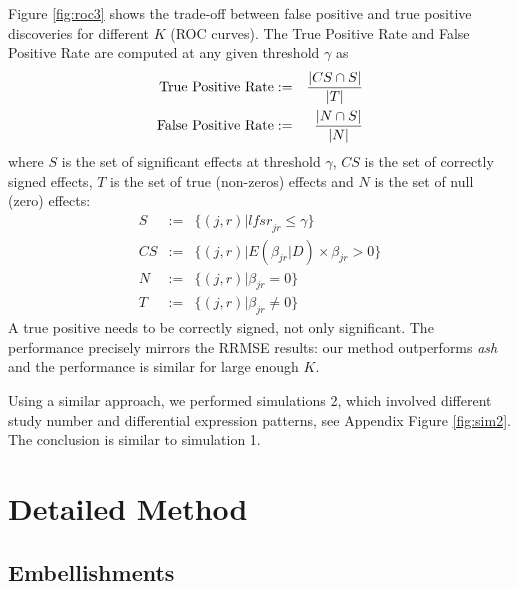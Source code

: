 \documentclass[12pt]{article}
\def\lfsr{\textit{lfsr}}
\begin{document}
\vspace{4mm}\noindent Figure \ref{fig:roc3} shows the trade-off between false positive and true positive discoveries for different $K$ (ROC curves). The True Positive Rate and False Positive Rate are computed at any given threshold $\gamma$ as
\begin{eqnarray}
\textmd{True Positive Rate} &:=& \frac{|CS\cap S|}{|T|}\\
\textmd{False Positive Rate} &:=& \frac{|N\cap S|}{|N|}
\end{eqnarray}
where $S$ is the set of significant effects at threshold $\gamma$, $CS$ is the set of correctly signed effects, $T$ is the set of true (non-zeros) effects and $N$ is the set of null (zero) effects:
\begin{eqnarray}
S &:=& \{(j,r)|\lfsr_{jr}\leq\gamma \}\\
CS &:=& \{(j,r)|E(\beta_{jr}|D)\times\beta_{jr}>0\}\\
N &:=& \{(j,r)|\beta_{jr}=0 \}\\
T &:=& \{(j,r)|\beta_{jr}\neq 0 \}
\end{eqnarray}
A true positive needs to be correctly signed, not only significant. The performance precisely mirrors the RRMSE results: our method outperforms \emph{ash} and the performance is similar for large enough $K$. 

\vspace{4mm}\noindent Using a similar approach, we performed simulations 2, which involved different study number and differential expression patterns, see Appendix Figure \ref{fig:sim2}. The conclusion is similar to simulation 1. 

\newpage
\section{Detailed Method} 

\vspace{5mm}
\subsection{Embellishments}
\end{document}
